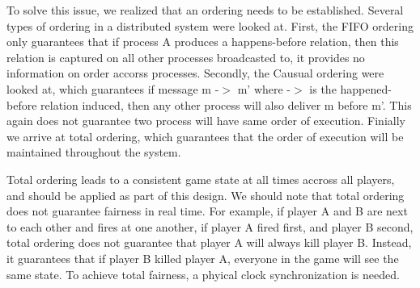 To solve this issue, we realized that an ordering needs to be established. Several types of ordering in a distributed system were looked at. First, the FIFO ordering only guarantees that if process A produces a happens-before relation, then this relation is captured on all other processes broadcasted to, it provides no information on order accorss processes. Secondly, the Causual ordering were looked at, which guarantees if message m -$>$ m' where -$>$ is the happened-before relation induced, then any other process will also deliver m before m'. This again does not guarantee two process will have same order of execution. Finially we arrive at total ordering, which guarantees that the order of execution will be maintained throughout the system.

Total ordering leads to a consistent game state at all times accross all players, and should be applied as part of this design. We should note that total ordering does not guarantee fairness in real time. For example, if player A and B are next to each other and fires at one another, if player A fired first, and player B second, total ordering does not guarantee that player A will always kill player B. Instead, it guarantees that if player B killed player A, everyone in the game will see the same state. To achieve total fairness, a phyical clock synchronization is needed.
